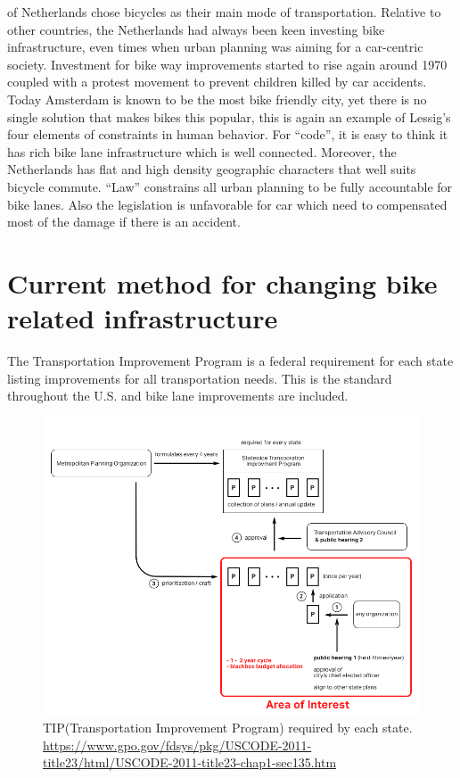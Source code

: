  of Netherlands chose bicycles as their main mode of transportation. Relative to other countries, the Netherlands had always been keen investing bike infrastructure, even times when urban planning was aiming for a car-centric society. Investment for bike way improvements started to rise again around 1970 coupled with a protest movement to prevent children killed by car accidents. Today Amsterdam is known to be the most bike friendly city, yet there is no single solution that makes bikes this popular, this is again an example of Lessig's four elements of constraints in human behavior. For ``code'', it is easy to think it has rich bike lane infrastructure which is well connected. Moreover, the Netherlands has flat and high density geographic characters that well suits bicycle commute. ``Law'' constrains all urban planning to be fully accountable for bike lanes. Also the legislation is unfavorable for car which need to compensated most of the damage if there is an accident.  

\section{Current method for changing bike related infrastructure}
The Transportation Improvement Program is a federal requirement for each state listing improvements for all transportation needs. This is the standard throughout the U.S. and bike lane improvements are included.
\begin{figure}[!htb]
  \includegraphics{chapters/4/fig/tip_process.png}               
  \caption[TIP process]{TIP(Transportation Improvement Program) required by each state. \url{https://www.gpo.gov/fdsys/pkg/USCODE-2011-title23/html/USCODE-2011-title23-chap1-sec135.htm} 
  }
  \label{fig:tip_process}
\end{figure}

